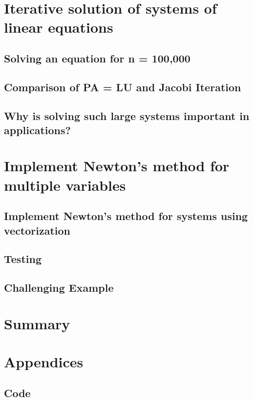 \documentclass[11pt]{article}
\begin{document}
\section{Iterative solution of systems of linear equations}

\subsection{Solving an equation for n = 100,000}

\subsection{Comparison of PA = LU and Jacobi Iteration}

\subsection{Why is solving such large systems important in applications?}

\section{Implement Newton's method for multiple variables}

\subsection{Implement Newton's method for systems using vectorization}

\subsection{Testing}

\subsection{Challenging Example}

\section{Summary}

\section{Appendices}

\subsection{Code}
\end{document}
